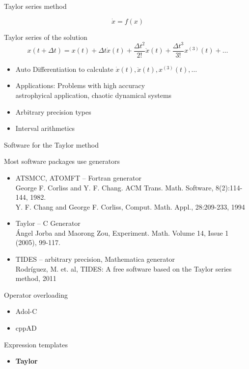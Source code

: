 \documentclass{beamer}
\begin{document}
\begin{frame}[fragile]{Taylor series method}

$$\dot{x} = f(x)$$

Taylor series of the solution
$$x(t+\Delta t) = x(t) + \Delta t \dot{x}(t) + \frac{\Delta t^2}{2!} \ddot{x}(t) + \frac{\Delta t^3}{3!} x^{(3)}(t) + \dots$$

\begin{itemize}
  \item Auto Differentiation to calculate $\dot{x}(t), \ddot{x}(t), x^{(3)}(t), \dots$
  \item Applications: Problems with high accuracy \\
        \hspace{2ex} astrophyical application, chaotic dynamical systems
  \item Arbitrary precision types
  \item Interval arithmetics
\end{itemize}




\end{frame}

\begin{frame}[fragile]{Software for the Taylor method}
 
Most software packages use generators
\begin{itemize}
 \item ATSMCC, ATOMFT  -- Fortran generator \\
  {\tiny George F. Corliss and Y. F. Chang. ACM Trans. Math. Software, 8(2):114-144, 1982.} \\
  {\tiny Y. F. Chang and George F. Corliss, Comput. Math. Appl., 28:209-233, 1994 }
 \item Taylor -- C Generator \\
  {\tiny \'Angel Jorba and Maorong Zou, Experiment. Math. Volume 14, Issue 1 (2005), 99-117.} 
 \item TIDES -- arbitrary precision, Mathematica generator \\
  {\tiny Rodr\'iguez, M. et. al, TIDES: A free software based on the Taylor series method, 2011}
\end{itemize}

\vspace{2ex}
Operator overloading
\begin{itemize}
  \item Adol-C
  \item cppAD
\end{itemize}

\vspace{2ex}
Expression templates
\begin{itemize}
  \item {\bf Taylor}
\end{itemize}


\end{frame}
\end{document}
